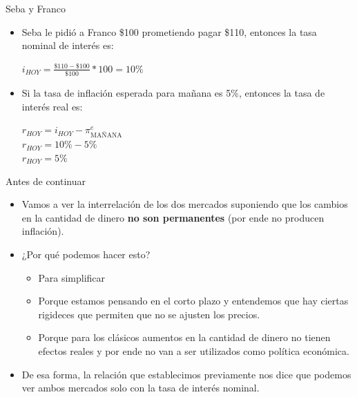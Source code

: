 \documentclass{beamer}
\begin{document}
\begin{frame}{Seba y Franco}
    \begin{itemize}
        \item Seba le pidió a Franco \$100 prometiendo pagar \$110, entonces la tasa nominal de interés es:
        \begin{center}
            $i_{HOY}=\frac{\$110 - \$100}{\$100} * 100 = 10\%$
        \end{center}
            \vspace{2mm}
        \item Si la tasa de inflación esperada para mañana es 5\%, entonces la tasa de interés real es: \\
        \begin{center}
            $r_{HOY} = i_{HOY}-\pi_{\text{MAÑANA}}^{e}$ \\
            \vspace{2mm}
            $r_{HOY} = 10\%-5\% $ \\
            \vspace{2mm}
            $r_{HOY} = 5\%$
        \end{center}
    \end{itemize}
\end{frame}

\begin{frame}{Antes de continuar}
    \begin{itemize}
        \item Vamos a ver la interrelación de los dos mercados suponiendo que los cambios en la cantidad de dinero \textbf{no son permanentes} (por ende no producen inflación).
        \item ¿Por qué podemos hacer esto?
        \begin{itemize}
            \item Para simplificar 
            \item Porque estamos pensando en el corto plazo y entendemos que hay ciertas rigideces que permiten que no se ajusten los precios.
            \item Porque para los clásicos aumentos en la cantidad de dinero no tienen efectos reales y por ende no van a ser utilizados como política económica.
        \end{itemize}
        \item De esa forma, la relación que establecimos previamente nos dice que podemos ver ambos mercados solo con la tasa de interés nominal.
    \end{itemize}
    
\end{frame}
\end{document}
